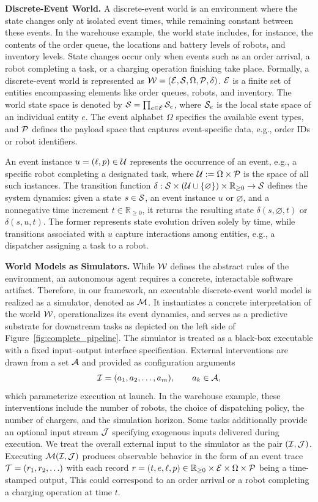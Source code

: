 \textbf{Discrete-Event World.}
A discrete-event world is an environment where the state changes only at isolated event times, while remaining constant between these events. 
In the warehouse example, the world state includes, for instance, the contents of the order queue, the locations and battery levels of robots, and inventory levels. State changes occur only when events such as an order arrival, a robot completing a task, or a charging operation finishing take place. 
Formally, a discrete-event world is represented as $\mathcal{W} = (\mathcal{E}, \mathcal{S}, \Omega, \mathcal{P}, \delta)$. $\mathcal{E}$ is a finite set of entities encompassing elements like order queues, robots, and inventory. The world state space is denoted by $\mathcal{S} = \prod_{e \in \mathcal{E}} \mathcal{S}_e$, where $\mathcal{S}_e$ is the local state space of an individual entity $e$. The event alphabet $\Omega$ specifies the available event types, and $\mathcal{P}$ defines the payload space that captures event-specific data, e.g., order IDs or robot identifiers.

An event instance \(u=(\ell,p)\in \mathcal{U}\) represents the occurrence of an event, e.g., a specific robot completing a designated task, where \(\mathcal{U} := \Omega \times \mathcal{P}\) is the space of all such instances.
The transition function \(\delta: \mathcal{S} \times (\mathcal{U} \cup \{\varnothing\}) \times \mathbb{R}_{\geq 0} \rightarrow \mathcal{S}\) defines the system dynamics: given a state \(s \in \mathcal{S}\), an event instance $u$ or $\varnothing$, and a nonnegative time increment \(t \in \mathbb{R}_{\geq 0}\), it returns the resulting state \(\delta(s,\varnothing,t)\) or \(\delta(s,u,t)\). The former represents state evolution driven solely by time, while transitions associated with \(u\) capture interactions among entities, e.g., a dispatcher assigning a task to a robot.


\textbf{World Models as Simulators.}
While $\mathcal{W}$ defines the abstract rules of the environment, an autonomous agent requires a concrete, interactable software artifact. Therefore, in our framework, an executable discrete-event world model is realized as a simulator, denoted as $\mathcal{M}$. It instantiates a concrete interpretation of the world $\mathcal{W}$, operationalizes its event dynamics, and serves as a predictive substrate for downstream tasks as depicted on the left side of Figure~\ref{fig:complete_pipeline}.
The simulator is treated as a black-box executable with a fixed input--output interface specification. External interventions are drawn from a set $\mathcal{A}$ and provided as configuration arguments
\[
\mathcal{I} = (a_1,a_2,\ldots,a_m), \qquad a_k \in \mathcal{A},
\]
which parameterize execution at launch. In the warehouse example, these interventions include the number of robots, the choice of dispatching policy, the number of chargers, and the simulation horizon. Some tasks additionally provide an optional input stream $\mathcal{J}$ specifying exogenous inputs delivered during execution. We treat the overall external input to the simulator as the pair $(\mathcal{I},\mathcal{J})$.
Executing $\mathcal{M}(\mathcal{I},\mathcal{J})$ produces observable behavior in the form of an event trace $\mathcal{T} = (r_1, r_2, \ldots)$ with each record $r = (t, e, \ell, p) \in \mathbb{R}_{\ge 0} \times \mathcal{E} \times \Omega \times \mathcal{P}$ being a time-stamped output,
This could correspond to an order arrival or a robot completing a charging operation at time $t$.

